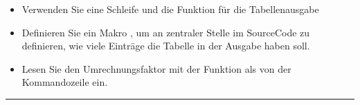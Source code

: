 \documentclass[a4paper,10pt,english]{report}
\begin{document}
\begin{sphinxVerbatim}[commandchars=\\\{\}]
       
   		  
   		  
   		  
   		  
  		  
  		  
  		  
  		  
\end{sphinxVerbatim}
\begin{itemize}
\item {} 
\sphinxAtStartPar
Verwenden Sie eine Schleife und die \sphinxhyphen{}Funktion für die Tabellenausgabe

\item {} 
\sphinxAtStartPar
Definieren Sie ein Makro , um an zentraler Stelle im Source\sphinxhyphen{}Code zu definieren, wie viele Einträge die Tabelle in der Ausgabe haben soll.

\item {} 
\sphinxAtStartPar
Lesen Sie den Umrechnungsfaktor mit der \sphinxhyphen{}Funktion als  von der Kommandozeile ein.

\end{itemize}


\bigskip\hrule\bigskip
\end{document}
